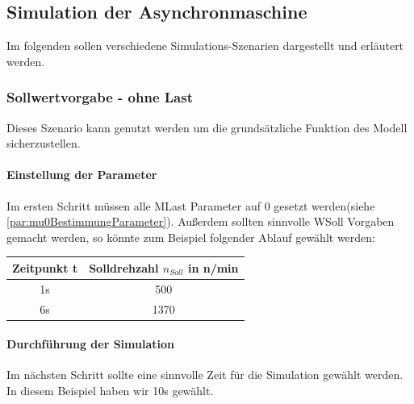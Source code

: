 \subsection{Simulation der Asynchronmaschine}
Im folgenden sollen verschiedene Simulations-Szenarien dargestellt und erläutert werden.
\subsubsection{Sollwertvorgabe - ohne Last}
Dieses Szenario kann genutzt werden um die grundsätzliche Funktion des Modell sicherzustellen.
\paragraph{Einstellung der Parameter}
Im ersten Schritt müssen alle MLast Parameter auf 0 gesetzt werden(siehe \ref{par:mu0BestimmungParameter}). Außerdem sollten sinnvolle WSoll Vorgaben gemacht werden, so könnte zum Beispiel folgender Ablauf gewählt werden:\\\par
	\begin{center}
		\begin{tabular}{c|c}
			Zeitpunkt t & Solldrehzahl $n_{Soll}$ in n/min\\ \hline
			1s & 500 \\
			6s & 1370 \\
		\end{tabular}
	\end{center}
\paragraph{Durchführung der Simulation}
Im nächsten Schritt sollte eine sinnvolle Zeit für die Simulation gewählt werden. In diesem Beispiel haben wir 10s gewählt.
